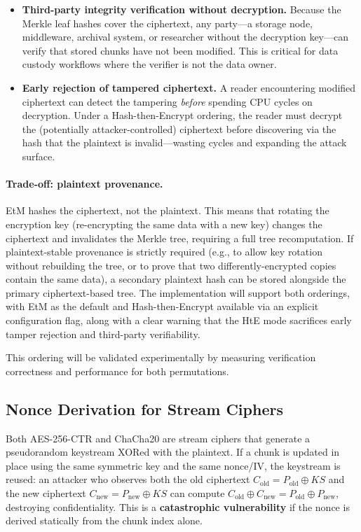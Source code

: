 \documentclass[11pt]{article}
\begin{document}
\begin{itemize}[nosep]
  \item \textbf{Third-party integrity verification without decryption.}
    Because the Merkle leaf hashes cover the ciphertext, any party---a storage
    node, middleware, archival system, or researcher without the decryption
    key---can verify that stored chunks have not been modified. This is
    critical for data custody workflows where the verifier is not the data
    owner.
  \item \textbf{Early rejection of tampered ciphertext.}
    A reader encountering modified ciphertext can detect the tampering
    \emph{before} spending CPU cycles on decryption. Under a
    Hash-then-Encrypt ordering, the reader must decrypt the (potentially
    attacker-controlled) ciphertext before discovering via the hash that the
    plaintext is invalid---wasting cycles and expanding the attack surface.
\end{itemize}

\paragraph{Trade-off: plaintext provenance.}
EtM hashes the ciphertext, not the plaintext. This means that rotating the
encryption key (re-encrypting the same data with a new key) changes the
ciphertext and invalidates the Merkle tree, requiring a full tree
recomputation. If plaintext-stable provenance is strictly required (e.g., to
allow key rotation without rebuilding the tree, or to prove that two
differently-encrypted copies contain the same data), a secondary plaintext hash
can be stored alongside the primary ciphertext-based tree. The implementation
will support both orderings, with EtM as the default and
Hash-then-Encrypt available via an explicit configuration flag, along with a
clear warning that the HtE mode sacrifices early tamper rejection and
third-party verifiability.

This ordering will be validated experimentally by measuring verification
correctness and performance for both permutations.

\subsection{Nonce Derivation for Stream Ciphers}
\label{sec:nonce}

Both AES-256-CTR and ChaCha20 are stream ciphers that generate a pseudorandom
keystream XORed with the plaintext. If a chunk is updated in place using the
same symmetric key and the same nonce/IV, the keystream is reused: an attacker
who observes both the old ciphertext $C_\text{old} = P_\text{old} \oplus KS$
and the new ciphertext $C_\text{new} = P_\text{new} \oplus KS$ can compute
$C_\text{old} \oplus C_\text{new} = P_\text{old} \oplus P_\text{new}$,
destroying confidentiality. This is a \textbf{catastrophic vulnerability} if
the nonce is derived statically from the chunk index alone.
\end{document}
